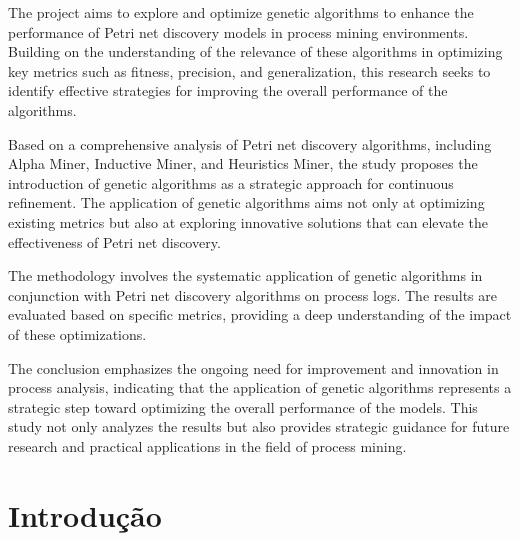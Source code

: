 \documentclass[tcc2]{classe_uftex/uftex}
\begin{document}
  \begin{foreignabstract}

The project aims to explore and optimize genetic algorithms to enhance the performance of Petri net discovery models in process mining environments. Building on the understanding of the relevance of these algorithms in optimizing key metrics such as fitness, precision, and generalization, this research seeks to identify effective strategies for improving the overall performance of the algorithms.

Based on a comprehensive analysis of Petri net discovery algorithms, including Alpha Miner, Inductive Miner, and Heuristics Miner, the study proposes the introduction of genetic algorithms as a strategic approach for continuous refinement. The application of genetic algorithms aims not only at optimizing existing metrics but also at exploring innovative solutions that can elevate the effectiveness of Petri net discovery.

The methodology involves the systematic application of genetic algorithms in conjunction with Petri net discovery algorithms on process logs. The results are evaluated based on specific metrics, providing a deep understanding of the impact of these optimizations.

The conclusion emphasizes the ongoing need for improvement and innovation in process analysis, indicating that the application of genetic algorithms represents a strategic step toward optimizing the overall performance of the models. This study not only analyzes the results but also provides strategic guidance for future research and practical applications in the field of process mining.

  
  \end{foreignabstract}
  \printlosymbols  
  \printloabbreviations
  \listoffigures
  \listoftables 
  \tableofcontents %
\mainmatter
\onehalfspacing
\chapter{Introdução}
\end{document}
